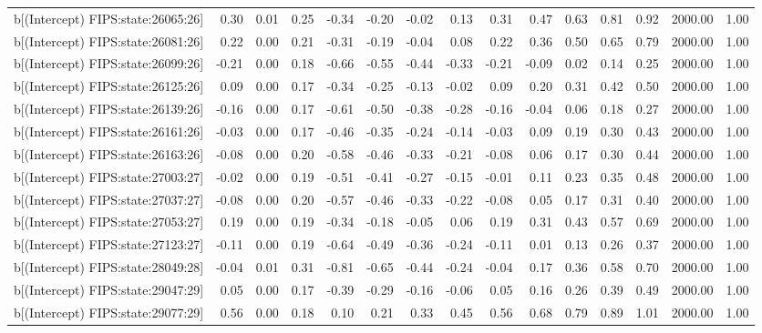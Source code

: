 \begin{table}[ht]
\begin{tabular}{rrrrrrrrrrrrrrr}
  b[(Intercept) FIPS:state:26065:26] & 0.30 & 0.01 & 0.25 & -0.34 & -0.20 & -0.02 & 0.13 & 0.31 & 0.47 & 0.63 & 0.81 & 0.92 & 2000.00 & 1.00 \\ 
  b[(Intercept) FIPS:state:26081:26] & 0.22 & 0.00 & 0.21 & -0.31 & -0.19 & -0.04 & 0.08 & 0.22 & 0.36 & 0.50 & 0.65 & 0.79 & 2000.00 & 1.00 \\ 
  b[(Intercept) FIPS:state:26099:26] & -0.21 & 0.00 & 0.18 & -0.66 & -0.55 & -0.44 & -0.33 & -0.21 & -0.09 & 0.02 & 0.14 & 0.25 & 2000.00 & 1.00 \\ 
  b[(Intercept) FIPS:state:26125:26] & 0.09 & 0.00 & 0.17 & -0.34 & -0.25 & -0.13 & -0.02 & 0.09 & 0.20 & 0.31 & 0.42 & 0.50 & 2000.00 & 1.00 \\ 
  b[(Intercept) FIPS:state:26139:26] & -0.16 & 0.00 & 0.17 & -0.61 & -0.50 & -0.38 & -0.28 & -0.16 & -0.04 & 0.06 & 0.18 & 0.27 & 2000.00 & 1.00 \\ 
  b[(Intercept) FIPS:state:26161:26] & -0.03 & 0.00 & 0.17 & -0.46 & -0.35 & -0.24 & -0.14 & -0.03 & 0.09 & 0.19 & 0.30 & 0.43 & 2000.00 & 1.00 \\ 
  b[(Intercept) FIPS:state:26163:26] & -0.08 & 0.00 & 0.20 & -0.58 & -0.46 & -0.33 & -0.21 & -0.08 & 0.06 & 0.17 & 0.30 & 0.44 & 2000.00 & 1.00 \\ 
  b[(Intercept) FIPS:state:27003:27] & -0.02 & 0.00 & 0.19 & -0.51 & -0.41 & -0.27 & -0.15 & -0.01 & 0.11 & 0.23 & 0.35 & 0.48 & 2000.00 & 1.00 \\ 
  b[(Intercept) FIPS:state:27037:27] & -0.08 & 0.00 & 0.20 & -0.57 & -0.46 & -0.33 & -0.22 & -0.08 & 0.05 & 0.17 & 0.31 & 0.40 & 2000.00 & 1.00 \\ 
  b[(Intercept) FIPS:state:27053:27] & 0.19 & 0.00 & 0.19 & -0.34 & -0.18 & -0.05 & 0.06 & 0.19 & 0.31 & 0.43 & 0.57 & 0.69 & 2000.00 & 1.00 \\ 
  b[(Intercept) FIPS:state:27123:27] & -0.11 & 0.00 & 0.19 & -0.64 & -0.49 & -0.36 & -0.24 & -0.11 & 0.01 & 0.13 & 0.26 & 0.37 & 2000.00 & 1.00 \\ 
  b[(Intercept) FIPS:state:28049:28] & -0.04 & 0.01 & 0.31 & -0.81 & -0.65 & -0.44 & -0.24 & -0.04 & 0.17 & 0.36 & 0.58 & 0.70 & 2000.00 & 1.00 \\ 
  b[(Intercept) FIPS:state:29047:29] & 0.05 & 0.00 & 0.17 & -0.39 & -0.29 & -0.16 & -0.06 & 0.05 & 0.16 & 0.26 & 0.39 & 0.49 & 2000.00 & 1.00 \\ 
  b[(Intercept) FIPS:state:29077:29] & 0.56 & 0.00 & 0.18 & 0.10 & 0.21 & 0.33 & 0.45 & 0.56 & 0.68 & 0.79 & 0.89 & 1.01 & 2000.00 & 1.00 \\ 

\end{tabular}
\end{table}
